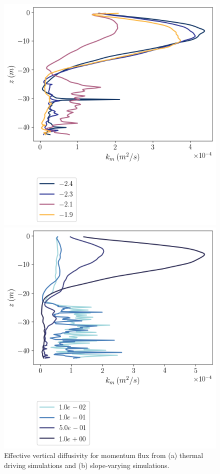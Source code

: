 \begin{figure}[H]
    \centering
    \begin{minipage}{0.5\textwidth}
        \includegraphics[trim={0 4.5cm 0 0},clip, width=\textwidth]{Figures/km_cmp_dT_44h_tav12_z_profile.png}
    \end{minipage}%
    \begin{minipage}{0.5\textwidth}
        \includegraphics[trim={0 4.5cm 0 0},clip, width=\textwidth]{Figures/km_cmp_slope_46h_tav12_z_profile.png}
    \end{minipage}
    \caption{Effective vertical diffusivity for momentum flux from (a) thermal driving simulations and (b) slope-varying simulations.}
    \label{fig:km}
\end{figure}